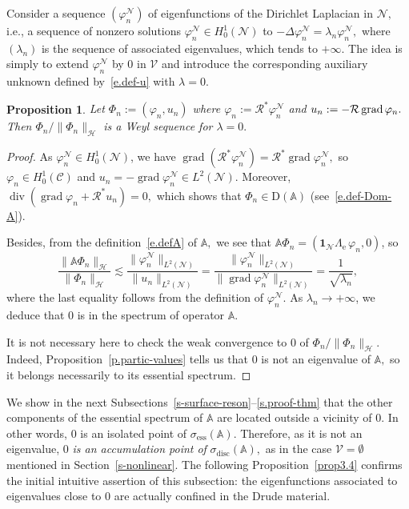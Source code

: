 \documentclass[10pt]{amsart}
\newtheorem{prop}[cdrthm]{Proposition}
\theoremstyle{definition}
\DeclareMathOperator{\Div}{div}
\DeclareMathOperator{\grad}{grad}
\DeclareMathOperator{\ess}{ess}
\DeclareMathOperator{\disc}{disc}
\newcommand{\calC}{\mathcal{C}}
\newcommand{\calH}{\mathcal{H}}
\newcommand{\calN}{\mathcal{N}}
\newcommand{\calR}{\mathcal{R}}
\newcommand{\calV}{\mathcal{V}}
\newcommand{\bbA}{\mathbb{A}}
\newcommand{\rmD}{{\mathrm{D}}}
\newcommand{\Un}{\boldsymbol{1}}
\newcommand{\Le}{{\Lambda_{\mathrm{e}}}}
\begin{document}
Consider a sequence $(\varphi_n^\calN)$ of eigenfunctions of the Dirichlet Laplacian in $\calN,$ i.e., a sequence of nonzero solutions $\varphi_n^\calN \in H^1_0(\calN)$ to $-\Delta \varphi_n^\calN = \lambda_n \varphi_n^\calN,$ where $(\lambda_n)$ is the sequence of associated eigenvalues, which tends to $+\infty.$ The idea is simply to extend $\varphi_n^\calN$ by 0 in $\calV$ and introduce the corresponding auxiliary unknown defined by~\eqref{e.def-u} with $\lambda=0.$
\pagebreak


\begin{prop}\label{p-Weyl-bulk}
Let $\Phi_n := (\varphi_n,u_n)$ where $\varphi_n := \calR^* \varphi_n^\calN$ and $u_n :=\linebreak- \calR \grad \varphi_n.$ Then $\Phi_n/\|\Phi_n\|_\calH$ is a Weyl sequence for $\lambda = 0.$
\end{prop}


\begin{proof}
As $\varphi_n^\calN \in H_0^1(\calN)$, we have $\grad (\calR^* \varphi_n^\calN) = \calR^* \grad \varphi_n^\calN,$ so $\varphi_n \in H_0^1(\calC)$ and $u_n = - \grad \varphi_n^\calN \in L^2(\calN)$. Moreover, $\Div (\grad \varphi_n + \calR^* u_n) = 0,$ which shows that $\Phi_n \in \rmD(\bbA)$ (see~\eqref{e.def-Dom-A}).

Besides, from the definition~\eqref{e.defA} of $\bbA,$ we see that $\bbA \Phi_n = (\Un_\calN \Le \, \varphi_n,0)$, so
\[
\frac{\| \bbA \Phi_n \|_\calH}{\| \Phi_n \|_\calH}
\lesssim \frac{ \| \varphi_n^\calN \|_{L^2(\calN)} }{\| u_n \|_{L^2(\calN)}} = \frac{ \| \varphi_n^\calN \|_{L^2(\calN)} }{\| \grad \varphi_n^\calN \|_{L^2(\calN)}} = \frac{1}{\sqrt{\lambda_n}},
\]
where the last equality follows from the definition of $\varphi_n^\calN.$ As $\lambda_n \to +\infty$, we deduce that $0$ is in the spectrum of operator $\bbA$.

It is not necessary here to check the weak convergence to 0 of $\Phi_n/\|\Phi_n\|_\calH.$ Indeed, Proposition~\ref{p.partic-values} tells us that $0$ is not an eigenvalue of $\bbA,$ so it belongs necessarily to its essential spectrum.
\end{proof}

We show in the next Subsections~\ref{s-surface-reson}--\ref{s.proof-thm} that the other components of the essential spectrum of $\bbA$ are located outside a vicinity of $0.$ In other words, $0$ is an isolated point of $\sigma_{\ess}(\bbA).$ Therefore, as it is not an eigenvalue, $0$ \emph{is an accumulation point of} $\sigma_{\disc}(\bbA),$ as in the case $\calV = \emptyset$ mentioned in Section~\ref{s-nonlinear}. The following Proposition~\ref{prop3.4} confirms the initial intuitive assertion of this subsection: the eigenfunctions associated to eigenvalues close to 0 are actually confined in the Drude material.
\end{document}
